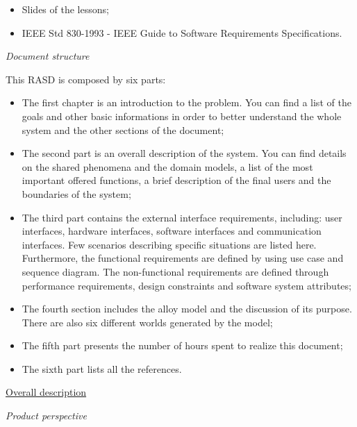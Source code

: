 \documentclass{article}
\begin{document}
\begin{legal}
\begin{legal}
{\begin{itemize}
			\item Slides of the lessons;\\
			\item IEEE Std 830-1993 - IEEE Guide to Software Requirements Specifications.\\
			\end{itemize}
		}
		\item \textit{Document structure}\\
		{\normalfont
This RASD is composed by six parts:
		\begin{itemize}
		\item The first chapter is an introduction to the problem. You can find a list of the goals and other basic informations in order to better understand the whole system and the other sections of the document;\\
		\item The second part is an overall description of the system. You can find details on the shared phenomena and the domain models, a list of the most important offered functions, a brief description of the final users and the boundaries of the system;\\
		\item The third part contains the external interface requirements, including: user interfaces, hardware interfaces, software interfaces and communication interfaces. Few scenarios describing specific situations are listed here. Furthermore, the functional requirements are defined by using use case and sequence diagram. The non-functional requirements are defined through performance requirements, design constraints and software system attributes;\\
		\item The fourth section includes the alloy model and the discussion of its purpose. There are also six different worlds generated by the model;\\
		\item The fifth part presents the number of hours spent to realize this document;\\
		\item The sixth part lists all the references.\\
		\end{itemize}
		}		
		\end{legal}
		\newpage
  	\item \underline{Overall description}
  		\begin{legal}
    		\item \textit{Product perspective}\\\\

\end{legal}
\end{legal}
\end{document}
